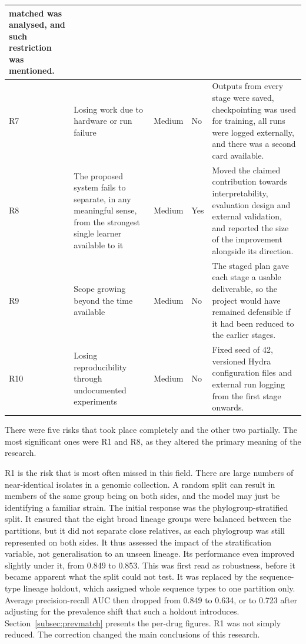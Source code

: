 {\begin{longtable}{|l|>{\raggedright\arraybackslash}p{4.3cm}|>{\raggedright\arraybackslash}p{1.5cm}|>{\raggedright\arraybackslash}p{1.4cm}|>{\raggedright\arraybackslash}p{5.0cm}|}
matched was analysed, and such restriction was mentioned. \\
\hline
R7 & Losing work due to hardware or run failure & Medium & No &
Outputs from every stage were saved, checkpointing was used for training, all runs were logged
externally, and there was a second card available. \\
\hline
R8 & The proposed system fails to separate, in any meaningful sense, from the strongest single
learner available to it & Medium & Yes &
Moved the claimed contribution towards interpretability, evaluation design and external
validation, and reported the size of the improvement alongside its direction. \\
\hline
R9 & Scope growing beyond the time available & Medium & No &
The staged plan gave each stage a usable deliverable, so the project would have remained
defensible if it had been reduced to the earlier stages. \\
\hline
R10 & Losing reproducibility through undocumented experiments & Medium & No &
Fixed seed of 42, versioned Hydra configuration files and external run logging from the first
stage onwards. \\
\end{longtable}}

There were five risks that took place completely and the other two partially. The most
significant ones were R1 and R8, as they altered the primary meaning of the research.

R1 is the risk that is most often missed in this field. There are large numbers of
near-identical isolates in a genomic collection. A random split can result in members of the
same group being on both sides, and the model may just be identifying a familiar strain. The
initial response was the phylogroup-stratified split. It ensured that the eight broad lineage
groups were balanced between the partitions, but it did not separate close relatives, as each
phylogroup was still represented on both sides. It thus assessed the impact of the
stratification variable, not generalisation to an unseen lineage. Its performance even improved
slightly under it, from 0.849 to 0.853. This was first read as robustness, before it became
apparent what the split could not test. It was replaced by the sequence-type lineage holdout,
which assigned whole sequence types to one partition only. Average precision-recall AUC then
dropped from 0.849 to 0.634, or to 0.723 after adjusting for the prevalence shift that such a
holdout introduces. Section~\ref{subsec:prevmatch} presents the per-drug figures. R1 was not
simply reduced. The correction changed the main conclusions of this research.

